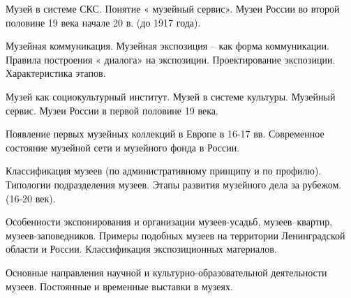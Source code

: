 \documentclass[
	14pt,
	a4paper,
	]
	{scrartcl}
\begin{document}
\shapk
{}
\setcounter{zad}{0}

\vfill
\z Музей в системе СКС. Понятие « музейный сервис».
 \vfill
\z Музеи России во второй половине 19 века начале 20 в. (до 1917 года). \vfill

\vfill

\newpage


\shapk
{}
\setcounter{zad}{0}

\vfill
\z Музейная коммуникация. Музейная экспозиция – как форма коммуникации. Правила построения « диалога» на экспозиции.
 \vfill
\z Проектирование экспозиции. Характеристика этапов.
 \vfill

\vfill

\newpage


\shapk
{}
\setcounter{zad}{0}

\vfill
\z Музей как социокультурный институт. Музей в системе культуры. Музейный сервис.
 \vfill
\z Музеи России в первой половине 19 века.
 \vfill

\vfill

\newpage


\shapk
{}
\setcounter{zad}{0}

\vfill
\z Появление первых музейных коллекций в Европе в 16-17 вв. 
 \vfill
\z Современное состояние музейной сети и музейного фонда в России.
 \vfill

\vfill

\newpage


\shapk
{}
\setcounter{zad}{0}

\vfill
\z Классификация музеев (по административному принципу и по профилю). Типологии подразделения музеев.
 \vfill
\z Этапы развития музейного дела за рубежом. (16-20 век). 
 \vfill

\vfill

\newpage


\shapk
{}
\setcounter{zad}{0}

\vfill
\z Особенности экспонирования и организации музеев-усадьб, музеев–квартир, музеев-заповедников. Примеры подобных музеев на территории Ленинградской области и России. 
 \vfill
\z Классификация экспозиционных материалов.
 \vfill

\vfill

\newpage


\shapk
{}
\setcounter{zad}{0}

\vfill
\z Основные направления научной и культурно-образовательной деятельности музеев.
 \vfill
\z Постоянные и временные выставки в музеях.
 \vfill
\end{document}
